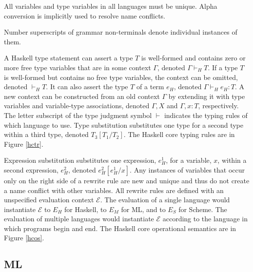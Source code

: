 All variables and type variables in all languages must be unique.  Alpha conversion is implicitly used to resolve name conflicts.

Number superscripts of grammar non-terminals denote individual instances of them.

A Haskell type statement can assert a type $T$ is well-formed and contains zero or more free type variables that are in some context $\Gamma$, denoted $\Gamma\vdash_{H}T$.  If a type $T$ is well-formed but contains no free type variables, the context can be omitted, denoted $\vdash_{H}T$.  It can also assert the type $T$ of a term $e_{H}$, denoted $\Gamma\vdash_{H}e_{H}:T$.  A new context can be constructed from an old context $\Gamma$ by extending it with type variables and variable-type associations, denoted $\Gamma,X$ and $\Gamma,x:T$, respectively.  The letter subscript of the type judgment symbol $\vdash$ indicates the typing rules of which language to use.  Type substitution substitutes one type for a second type within a third type, denoted $T_{3}[T_{1}/T_{2}]$.  The Haskell core typing rules are in Figure \ref{hctr}.

Expression substitution substitutes one expression, $e_{H}^{1}$, for a variable, $x$, within a second expression, $e_{H}^{2}$, denoted $e_{H}^{2}[e_{H}^{1}/x]$.  Any instances of variables that occur only on the right side of a rewrite rule are new and unique and thus do not create a name conflict with other variables.  All rewrite rules are defined with an unspecified evaluation context $\mathscr{E}$.  The evaluation of a single language would instantiate $\mathscr{E}$ to $E_{H}$ for Haskell, to $E_{M}$ for ML, and to $E_{S}$ for Scheme.  The evaluation of multiple languages would instantiate $\mathscr{E}$ according to the language in which programs begin and end.  The Haskell core operational semantics are in Figure \ref{hcos}.

\subsection{ML}

